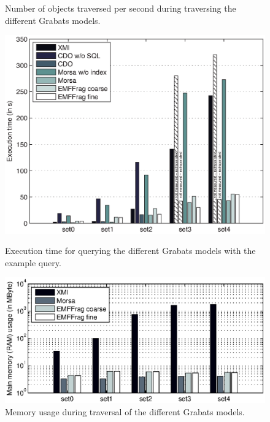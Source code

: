 \begin{figure}[t]
\begin{minipage}[b]{0.48\linewidth}
\caption{Number of objects traversed per second during traversing the different Grabats models.}
\label{fig:grabatsTraverseTime}
\end{minipage}
\hspace{0.02\linewidth}
\begin{minipage}[b]{0.48\linewidth}
\centering
\includegraphics[width=\linewidth]{figures/grabatsQueryTimeExtra}
\caption{Execution time for querying the different Grabats models with the example query.}
\label{fig:grabatsQueryTime}
\end{minipage}
\begin{minipage}[b]{0.48\linewidth}
\centering
\includegraphics[width=\linewidth]{figures/grabatsTraverseMem}
\caption{Memory usage during traversal of the different Grabats models.}
\label{fig:grabatsTraverseMem}
\end{minipage}

\end{figure}
